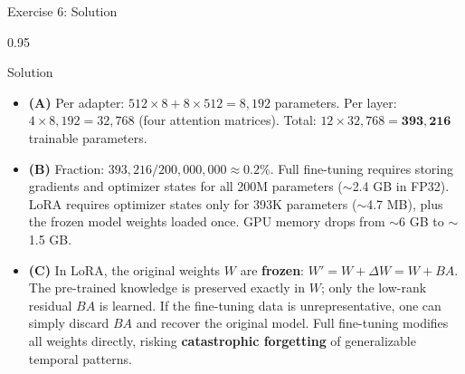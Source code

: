 \documentclass[9pt, aspectratio=169, t]{beamer}
\begin{document}
\begin{frame}{Exercise 6: Solution}
    \begin{cminipage}{0.95\textwidth}
    \begin{exampleblock}{Solution}
        {\small
        \begin{itemize}\setlength{\itemsep}{3pt}
            \item \textcolor{MainBlue}{\textbf{(A)}} Per adapter: $512 \times 8 + 8 \times 512 = 8{,}192$ parameters. Per layer: $4 \times 8{,}192 = 32{,}768$ (four attention matrices). Total: $12 \times 32{,}768 = \mathbf{393{,}216}$ trainable parameters.
            \item \textcolor{MainBlue}{\textbf{(B)}} Fraction: $393{,}216 / 200{,}000{,}000 \approx \mathbf{0.2\%}$. Full fine-tuning requires storing gradients and optimizer states for all 200M parameters ($\sim$2.4 GB in FP32). LoRA requires optimizer states only for 393K parameters ($\sim$4.7 MB), plus the frozen model weights loaded once. GPU memory drops from $\sim$6 GB to $\sim$1.5 GB.
            \item \textcolor{MainBlue}{\textbf{(C)}} In LoRA, the original weights $W$ are \textbf{frozen}: $W' = W + \Delta W = W + BA$. The pre-trained knowledge is preserved exactly in $W$; only the low-rank residual $BA$ is learned. If the fine-tuning data is unrepresentative, one can simply discard $BA$ and recover the original model. Full fine-tuning modifies all weights directly, risking \textbf{catastrophic forgetting} of generalizable temporal patterns.
        \end{itemize}
        }
    \end{exampleblock}
    \end{cminipage}
\end{frame}
\end{document}
